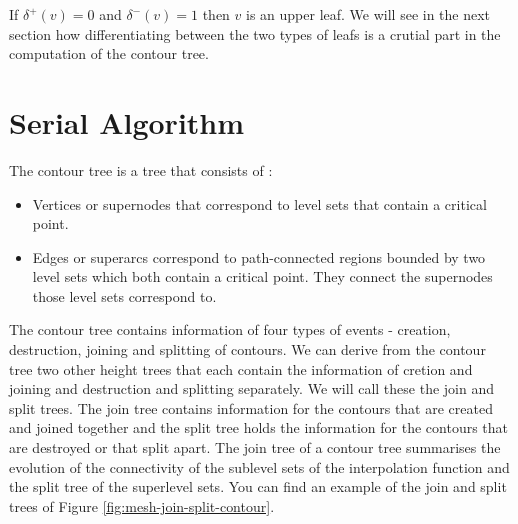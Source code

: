 If $\delta^+(v) = 0$ and $\delta^-(v) = 1$ then $v$ is an upper leaf. We will see in the next section how differentiating between the two types of leafs is a crutial part in the computation of the contour tree.

\section{Serial Algorithm}

The contour tree is a tree that consists of \cite{first-ct-algo}:

\begin{itemize}
    \item Vertices or supernodes that correspond to level sets that contain a critical point.
    \item Edges or superarcs correspond to path-connected regions bounded by two level sets which both contain a critical point. They connect the supernodes those level sets correspond to.
\end{itemize}

The contour tree contains information of four types of events - creation, destruction, joining and splitting of contours. We can derive from the contour tree two other height trees that each contain the information of cretion and joining and destruction and splitting separately. We will call these the join and split trees. The join tree contains information for the contours that are created and joined together and the split tree holds the information for the contours that are destroyed or that split apart. The join tree of a contour tree summarises the evolution of the connectivity of the sublevel sets of the interpolation function and the split tree of the superlevel sets. You can find an example of the join and split trees of Figure \ref{fig:mesh-join-split-contour}.


